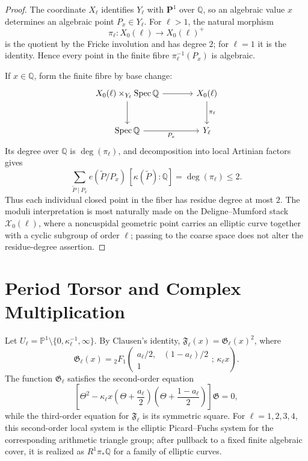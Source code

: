 \documentclass[11pt,a4paper]{amsart} %
\theoremstyle{definition}
\newcommand{\Q}{\mathbb Q}
\begin{document}
\begin{proof}
The coordinate \(X_\ell\) identifies \(Y_\ell\) with \(\mathbf P^1\) over
\(\Q\), so an algebraic value \(x\) determines an algebraic point
\(P_x\in Y_\ell\). For \(\ell>1\), the natural morphism
\[
\pi_\ell:X_0(\ell)\longrightarrow X_0(\ell)^+
\]
is the quotient by the Fricke involution and has degree \(2\); for
\(\ell=1\) it is the identity. Hence every point in the finite fibre
\(\pi_\ell^{-1}(P_x)\) is algebraic.

If \(x\in\Q\), form the finite fibre by base change:
\[
\begin{tikzcd}[column sep=large,row sep=large]
X_0(\ell)\times_{Y_\ell}\operatorname{Spec}\Q
  \arrow[r] \arrow[d]
& X_0(\ell) \arrow[d,"\pi_\ell"]\\
\operatorname{Spec}\Q \arrow[r,"P_x"']
& Y_\ell
\end{tikzcd}
\]
Its degree over \(\Q\) is \(\deg(\pi_\ell)\), and decomposition into local
Artinian factors gives
\[
\sum_{\widetilde P\mid P_x}
e(\widetilde P/P_x)\,[\kappa(\widetilde P):\Q]
=\deg(\pi_\ell)\le2.
\]
Thus each individual closed point in the fiber has residue degree at most
\(2\). The moduli interpretation is most naturally made on the Deligne--Mumford stack \(\mathcal X_0(\ell)\), where a noncuspidal geometric point carries an elliptic curve together with a cyclic subgroup of order \(\ell\); passing to the coarse space does not alter the residue-degree assertion.
\end{proof}

\section{Period Torsor and Complex Multiplication}

Let $U_\ell=\mathbb P^1\setminus\{0,\kappa_\ell^{-1},\infty\}$. By Clausen's identity, ${\mathfrak F}_\ell(x)=\mathfrak G_\ell(x)^2$, where
\[
\mathfrak G_\ell(x)=
{}_2F_1\!\left(
\begin{matrix}
a_\ell/2,& (1-a_\ell)/2\\
1&
\end{matrix};\,\kappa_\ell x
\right).
\]
The function \(\mathfrak G_\ell\) satisfies the second-order equation
\[
\left[
\Theta^2-\kappa_\ell x
\left(\Theta+\frac{a_\ell}{2}\right)
\left(\Theta+\frac{1-a_\ell}{2}\right)
\right]\mathfrak G=0,
\]
while the third-order equation for \({\mathfrak F}_\ell\) is its symmetric
square. For \(\ell=1,2,3,4\), this second-order local system is the elliptic
Picard--Fuchs system for the corresponding arithmetic triangle group; after
pullback to a fixed finite algebraic cover, it is realized as
\(R^1\pi_*\Q\) for a family of elliptic curves.
\end{document}
